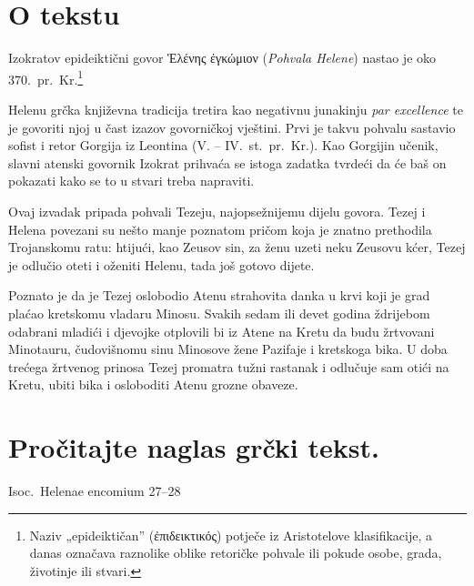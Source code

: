 
\section*{O tekstu}

Izokratov epideiktični govor \textgreek[variant=ancient]{Ἑλένης ἐγκώμιον} (\textit{Pohvala Helene}) nastao je oko 370.\ pr.~Kr.\footnote{Naziv „epideiktičan'' \textgreek[variant=ancient]{(ἐπιδεικτικός)} potječe iz Aristotelove klasifikacije, a danas označava raznolike oblike retoričke pohvale ili pokude osobe, grada, životinje ili stvari.}

Helenu grčka književna tradicija tretira kao negativnu junakinju \textit{par excellence} te je govoriti njoj u čast izazov govorničkoj vještini. Prvi je takvu pohvalu sastavio sofist i retor Gorgija iz Leontina (V. – IV.~st.\ pr.~Kr.). Kao Gorgijin učenik, slavni atenski govornik Izokrat prihvaća se istoga zadatka tvrdeći da će baš on pokazati kako se to u stvari treba napraviti.

Ovaj izvadak pripada pohvali Tezeju, najopsežnijemu dijelu govora. Tezej i Helena povezani su nešto manje poznatom pričom koja je znatno prethodila Trojanskomu ratu: htijući, kao Zeusov sin, za ženu uzeti neku Zeusovu kćer, Tezej je odlučio oteti i oženiti Helenu, tada još gotovo dijete. 

Poznato je da je Tezej oslobodio Atenu strahovita danka u krvi koji je grad plaćao kretskomu vladaru Minosu. Svakih sedam ili devet godina ždrijebom odabrani mladići i djevojke otplovili bi iz Atene na Kretu da budu žrtvovani Minotauru, čudovišnomu sinu Minosove žene Pazifaje i kretskoga bika. U doba trećega žrtvenog prinosa Tezej promatra tužni rastanak i odlučuje sam otići na Kretu, ubiti bika i osloboditi Atenu grozne obaveze. 


\section*{Pročitajte naglas grčki tekst.}

Isoc.\ Helenae encomium 27–28


\medskip


